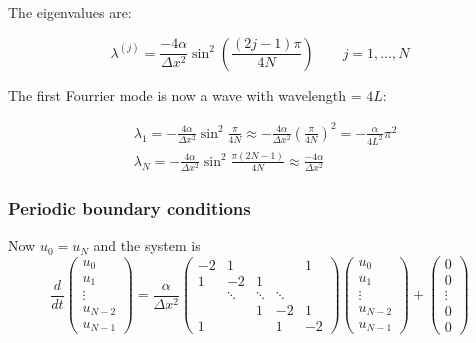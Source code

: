 The eigenvalues are: 

\begin{equation}
\lambda ^{(j)} = \frac{-4\alpha}{\Delta x^2}\sin ^2 \left( \frac{(2j-1)\pi}{4N} \right) \qquad j = 1, \dots , N
\end{equation}

The first Fourrier mode is now a wave with wavelength = $4L$:

\begin{equation}
\begin{aligned}
&\lambda _{1} = -\frac{4\alpha}{\Delta x^2} \sin ^2 \frac{\pi}{4N} \approx - \frac{4\alpha}{\Delta x^2} \left( \frac{\pi}{4N} \right)^2 = - \frac{\alpha}{4L^2}\pi ^2\\
&\lambda _{N} = -\frac{4\alpha}{\Delta x^2} \sin ^2 \frac{\pi (2N-1)}{4 N}\approx \frac{-4 \alpha}{\Delta x^2} 
\end{aligned}
\end{equation}


\subsubsection{Periodic boundary conditions}
Now $u_0 = u_N$ and the system is 
\begin{equation}
\frac{d}{dt} \left(\begin{array}{c}
u_0\\
u_1 \\
\vdots\\
u_{N-2}\\
u_{N-1}
\end{array} \right) = \frac{\alpha }{\Delta x^2}
\left(
\begin{array}{ccccc}
-2 & 1& & & 1  \\
1 & -2 & 1  \\
& \ddots & \ddots & \ddots \\
&  & 1 & -2 & 1\\
1 & & & 1& -2
\end{array}
\right)\left(\begin{array}{c}
u_0\\
u_1 \\
\vdots\\
u_{N-2}\\
u_{N-1}
\end{array} \right) 
+
\left(\begin{array}{c}
0\\
0 \\
\vdots\\
0\\
0
\end{array} \right) 
\end{equation}


